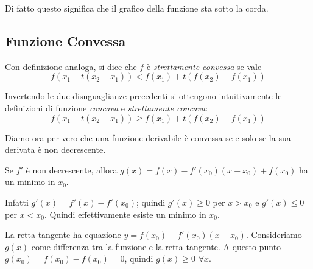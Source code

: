 Di fatto questo significa che il grafico della funzione sta sotto la corda.

\subsection{Funzione Convessa}

Con definizione analoga, si dice che $f$ è \emph{strettamente convessa} se vale
\begin{equation*}
f(x_1 + t(x_2-x_1)) < f(x_1) + t(f(x_2)-f(x_1))
\end{equation*}

Invertendo le due disuguaglianze precedenti si ottengono intuitivamente le definizioni di funzione \emph{concava} e \emph{strettamente concava}:
\begin{equation*}
f(x_1 + t(x_2-x_1)) \ge f(x_1) + t(f(x_2)-f(x_1))
\end{equation*}

\begin{center}
\end{center}

Diamo ora per vero che una funzione derivabile è convessa se e solo se la sua derivata è non decrescente.

Se $f'$ è non decrescente, allora $g(x) = f(x)-f'(x_0)(x-x_0) + f(x_0)$ ha un minimo in $x_0$.

Infatti $g'(x) = f'(x)-f'(x_0)$; quindi $g'(x) \ge 0$ per $x > x_0$ e $g'(x) \le 0$ per $x < x_0$. Quindi effettivamente esiste un minimo in $x_0$.

\begin{center}
\end{center}

La retta tangente ha equazione $y = f(x_0)+f'(x_0)(x-x_0)$. Consideriamo $g(x)$ come differenza tra la funzione e la retta tangente. A questo punto $g(x_0) = f(x_0) - f(x_0) = 0$, quindi $g(x) \ge 0$ $\forall x$.


